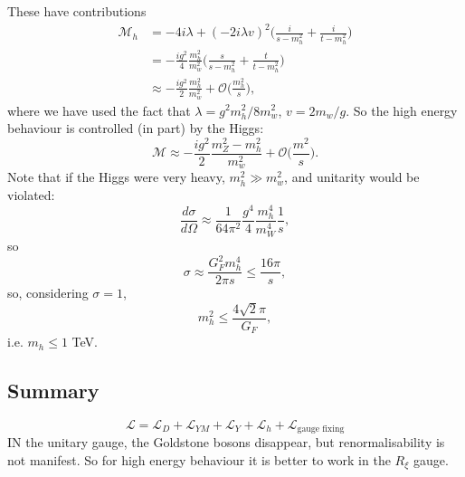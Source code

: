 \newline
These have contributions
\begin{equation}
\begin{split}
\mathcal{M}_h &= -4i\lambda + (-2i\lambda v)^2 \bigg(\frac{i}{s-m_h^2} + \frac{i}{t-m_h^2}\bigg) \\
&=-\frac{ig^2}{4}\frac{m_h^2}{m_w^2}\bigg(\frac{s}{s-m_h^2} + \frac{t}{t-m_h^2}\bigg) \\
&\approx - \frac{ig^2}{2}\frac{m_h^2}{m_w^2} + \mathcal{O}\bigg(\frac{m_h^2}{s}\bigg),
\end{split}
\end{equation}
where we have used the fact that $\lambda = g^2m_h^2/8m_w^2$, $v=2m_w/g$. So the high energy behaviour is controlled (in part) by the Higgs:
\begin{equation}
\mathcal{M} \approx -\frac{ig^2}{2}\frac{m_Z^2-m_h^2}{m_w^2} + \mathcal{O}\bigg(\frac{m^2}{s}\bigg).
\end{equation}
Note that if the Higgs were very heavy, $m_h^2 \gg m_w^2$, and unitarity would be violated:
\begin{equation}
\frac{d\sigma}{d\Omega} \approx \frac{1}{64\pi^2}\frac{g^4}{4}\frac{m_h^4}{m_W^4}\frac{1}{s},
\end{equation}
so 
\begin{equation}
\sigma \approx \frac{G_F^2 m_h^4}{2\pi s} \leq \frac{16 \pi}{s},
\end{equation}
so, considering $\sigma =1$,
\begin{equation}
m_h^2 \leq \frac{4 \sqrt{2} \pi}{G_F},
\end{equation}
i.e. $m_h \leq 1$ TeV.
%
\subsection{Summary}
%
\begin{equation}
\mathcal{L} = \mathcal{L}_D + \mathcal{L}_{YM} + \mathcal{L}_{Y} + \mathcal{L}_h + \mathcal{L}_{\text{gauge fixing}}
\end{equation}
IN the unitary gauge, the Goldstone bosons disappear, but renormalisability is not manifest. So for high energy behaviour it is better to work in the $R_\xi$ gauge. 
